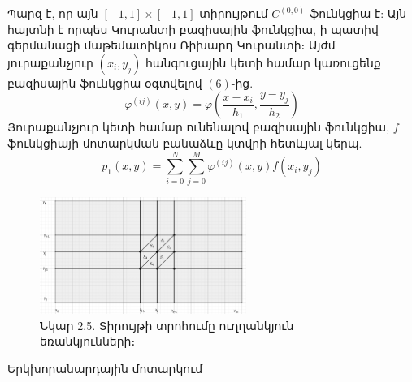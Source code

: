 \documentclass[fleqn, bachelor,subf,12pt,notitlepage]{article}
\begin{document}
Պարզ է, որ այն $\left[-1, 1\right] \times \left[-1	, 1\right]$ տիրույթում $C^{(0, 0)}$ ֆունկցիա է: Այն հայտնի է որպես Կուրանտի բազիսային ֆունկցիա, ի պատիվ գերմանացի մաթեմատիկոս Ռիխարդ Կուրանտի։
Այժմ յուրաքանչյուր $\left(x_{i}, y_{j}\right)$ հանգուցային կետի համար կառուցենք բազիսային ֆունկցիա օգտվելով $\left(6\right)$-ից.
\begin{equation}
\varphi^{(ij)}(x,y)=\varphi \left(\dfrac{x-x_{i}}{h_{1}}, \dfrac{y-y_{j}}{h_{2}}\right)
\end{equation}
Յուրաքանչյուր կետի համար ունենալով բազիսային ֆունկցիա, $f$ ֆունկցիայի մոտարկման բանաձևը կտվրի հետևյալ կերպ.
\begin{equation}
p_{1}(x,y)=\sum_{i=0}^{N}\sum_{j=0}^{M}\varphi^{(ij)}(x,y)f(x_{i}, y_{j})
\end{equation}
\begin{figure}[H]
\centering
\includegraphics[width=0.6\textwidth]{images/two_var_courant_3}
\captionsetup{labelformat=empty}
\caption{Նկար 2.5. Տիրույթի տրոհումը ուղղանկյուն եռանկյունների։}
\end{figure}

\newpage
{Երկխորանարդային մոտարկում}
\end{document}
